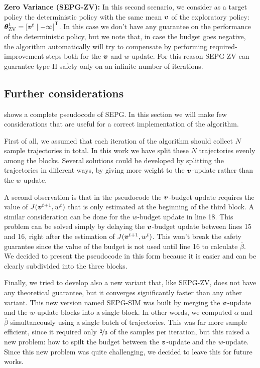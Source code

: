 \textbf{Zero Variance (SEPG-ZV):} In this second scenario, we consider as a target policy the deterministic policy with the same mean $\boldsymbol{v}$ of the exploratory policy: ${\boldsymbol{\theta}}^t_{\text{ZV}} = {[\boldsymbol{v}^t \mid -\infty]}^{\mathsf{T}}$. In this case we don't have any guarantee on the performance of the deterministic policy, but we note that, in case the budget goes negative, the algorithm automatically will try to compensate by performing required-improvement steps both for the $\boldsymbol{v}$ and $w$-update. For this reason SEPG-ZV can guarantee type-II safety only on an infinite number of iterations. 




\subsection{Further considerations}
 shows a complete pseudocode of SEPG. In this section we will make few considerations that are useful for a correct implementation of the algorithm.

First of all, we assumed that each iteration of the algorithm should collect $N$ sample trajectories in total. In this work we have split these $N$ trajectories evenly among the blocks. Several solutions could be developed by splitting the trajectories in different ways, \eg by giving more weight to the $\boldsymbol{v}$-update rather than the $w$-update.

A second observation is that in the pseudocode the $\boldsymbol{v}$-budget update requires the value of $J(\boldsymbol{v}^{t+1}, w^t)$ that is only estimated at the beginning of the third block. A similar consideration can be done for the $w$-budget update in line 18. This problem can be solved simply by delaying the $\boldsymbol{v}$-budget update between lines 15 and 16, right after the estimation of $J(\boldsymbol{v}^{t+1}, w^t)$. This won't break the safety guarantee since the value of the budget is not used until line 16 to calculate $\overline{\beta}$. We decided to present the pseudocode in this form because it is easier and can be clearly subdivided into the three blocks.

Finally, we tried to develop also a new variant that, like SEPG-ZV, does not have any theoretical guarantee, but it converges significantly faster than any other variant. This new version named SEPG-SIM was built by merging the $\boldsymbol{v}$-update and the $w$-update blocks into a single block. In other words, we computed $\overline{\alpha}$ and $\overline{\beta}$ simultaneously using a single batch of trajectories. This was far more sample efficient, since it required only $\nicefrac{2}{3}$ of the samples per iteration, but this raised a new problem: how to spilt the budget between the $\boldsymbol{v}$-update and the $w$-update. Since this new problem was quite challenging, we decided to leave this for future works.
